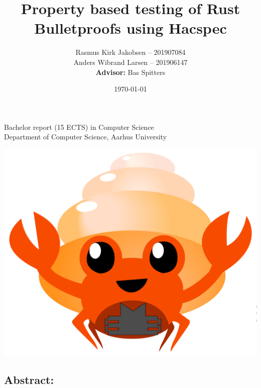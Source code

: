 \documentclass{article}
\title{Property based testing of Rust Bulletproofs using Hacspec}
\author{ 
Rasmus Kirk Jakobsen -- 201907084\\
Anders Wibrand Larsen -- 201906147\\
\textbf{Advisor:} Bas Spitters
}
\date{\today}
\begin{document}
\maketitle

\begin{center}
    Bachelor report (15 ECTS) in Computer Science\\
Department of Computer Science, Aarhus University\\
\end{center} 

\begin{center}
	\includegraphics[scale=0.4]{img/bulletproof-hacspec-2.png}
\end{center} 

\subsection*{Abstract:}
\end{document}
